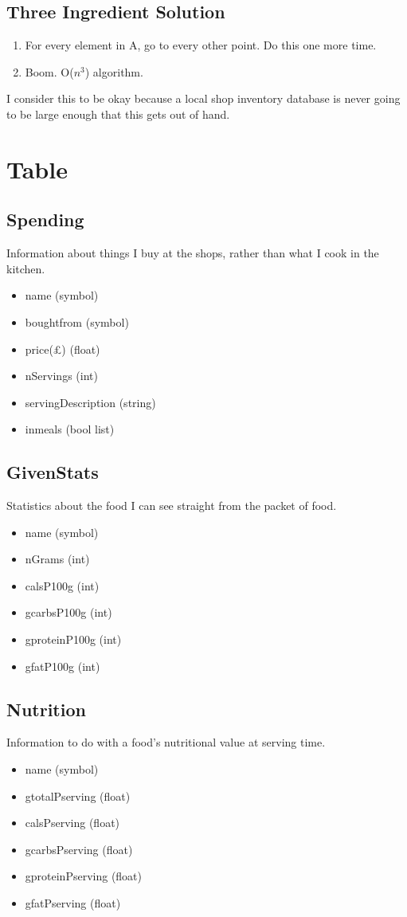 \documentclass[a4paper]{article}
\begin{document}
\subsection{Three Ingredient Solution}

\begin{enumerate}
  \item For every element in A, go to every other point. Do this one more time.
  \item Boom. O($n^{3}$) algorithm.
\end{enumerate}

I consider this to be okay because a local shop inventory database is 
never going to be large enough that this gets out of hand.

\section{Table}

\subsection{Spending}

Information about things I buy at the shops, rather than what I cook in the 
kitchen.

\begin{itemize}
  \item name (symbol)
  \item boughtfrom (symbol)
  \item price(£) (float)
  \item nServings (int)
  \item servingDescription (string)
  \item inmeals (bool list)
\end{itemize}

\subsection{GivenStats}

Statistics about the food I can see straight from the packet of food.

\begin{itemize}
  \item name (symbol)
  \item nGrams (int)
  \item calsP100g (int)
  \item gcarbsP100g (int)
  \item gproteinP100g (int)
  \item gfatP100g (int)
\end{itemize} 
  
\subsection{Nutrition}

Information to do with a food's nutritional value at serving time.

\begin{itemize}
  \item name (symbol)
  \item gtotalPserving (float)
  \item calsPserving (float)
  \item gcarbsPserving (float)
  \item gproteinPserving (float)
  \item gfatPserving (float)
\end{itemize}
\end{document}
